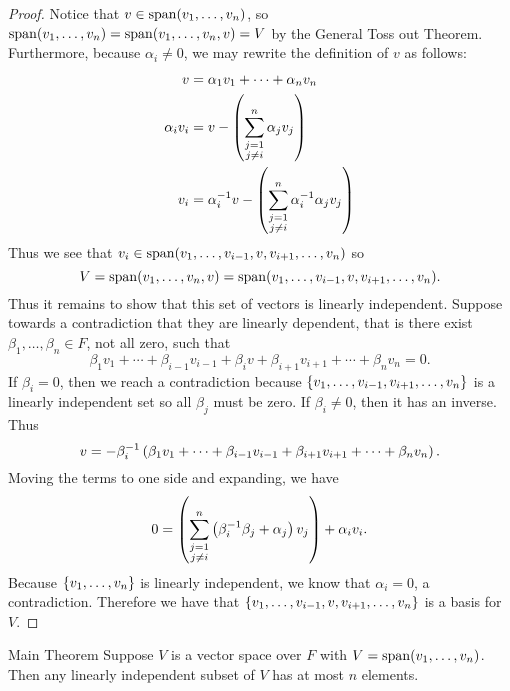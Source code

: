 \documentclass[class=article, crop=false]{standalone}
\begin{document}
  \begin{proof}
    Notice that $v\in \operatorname{span}(v_1,\dotsc,v_n)$, so $\operatorname{span}(v_1,\dotsc,v_n) = \operatorname{span}(v_1,\dotsc,v_n,v) = V$ by the General Toss out Theorem. Furthermore, because $\alpha_i\neq 0$, we may rewrite the definition of $v$ as follows:
    \begin{align*}
      v &= \alpha_1v_1 + \dotsb + \alpha_nv_n \\
      \alpha_iv_i &= v - \left( \sum_{\substack{j=1\\j\neq i}}^{n}\alpha_jv_j \right) \\
      v_i &= \alpha_i^{-1} v - \left( \sum_{\substack{j=1\\j\neq i}}^{n}\alpha_i^{-1}\alpha_jv_j \right)
    \end{align*}
    Thus we see that $v_i\in \operatorname{span}(v_1,\dotsc,v_{i-1},v,v_{i+1},\dotsc,v_n)$ so 
    \[
      V = \operatorname{span}(v_1,\dotsc,v_n, v) = \operatorname{span}(v_1,\dotsc,v_{i-1},v,v_{i+1},\dotsc,v_n).
    \]
    Thus it remains to show that this set of vectors is linearly independent. Suppose towards a contradiction that they are linearly dependent, that is there exist $\beta_1,\dotsc,\beta_n\in F$, not all zero, such that
    \[
      \beta_1v_1 + \dotsb + \beta_{i-1}v_{i-1} + \beta_iv + \beta_{i+1}v_{i+1} + \dotsb + \beta_nv_n = 0.
    \]
    If $\beta_i = 0$, then we reach a contradiction because $\left\{v_1,\dotsc,v_{i-1},v_{i+1},\dotsc,v_n\right\}$ is a linearly independent set so all $\beta_j$ must be zero. If $\beta_i\neq 0$, then it has an inverse. Thus
    \[
      v = -\beta_i^{-1} \left( \beta_1v_1 + \dotsb + \beta_{i-1}v_{i-1} + \beta_{i+1}v_{i+1} + \dotsb + \beta_nv_n \right).
    \]
    Moving the terms to one side and expanding, we have
    \[
      0 = \left( \sum_{\substack{j=1\\j\neq i}}^{n}\left( \beta_i^{-1}\beta_j + \alpha_j \right)v_j \right) + \alpha_iv_i.
    \]
    Because $\left\{v_1,\dotsc,v_n\right\}$ is linearly independent, we know that $\alpha_i = 0$, a contradiction. Therefore we have that $\left\{v_1,\dotsc,v_{i-1},v,v_{i+1},\dotsc,v_n\right\}$ is a basis for $V$.
  \end{proof}
  \newpage
  \begin{theorem}{Main Theorem}
    Suppose $V$ is a vector space over $F$ with $V = \operatorname{span}(v_1,\dotsc,v_n)$. Then any linearly independent subset of $V$ has at most $n$ elements.
  \end{theorem}
\end{document}

